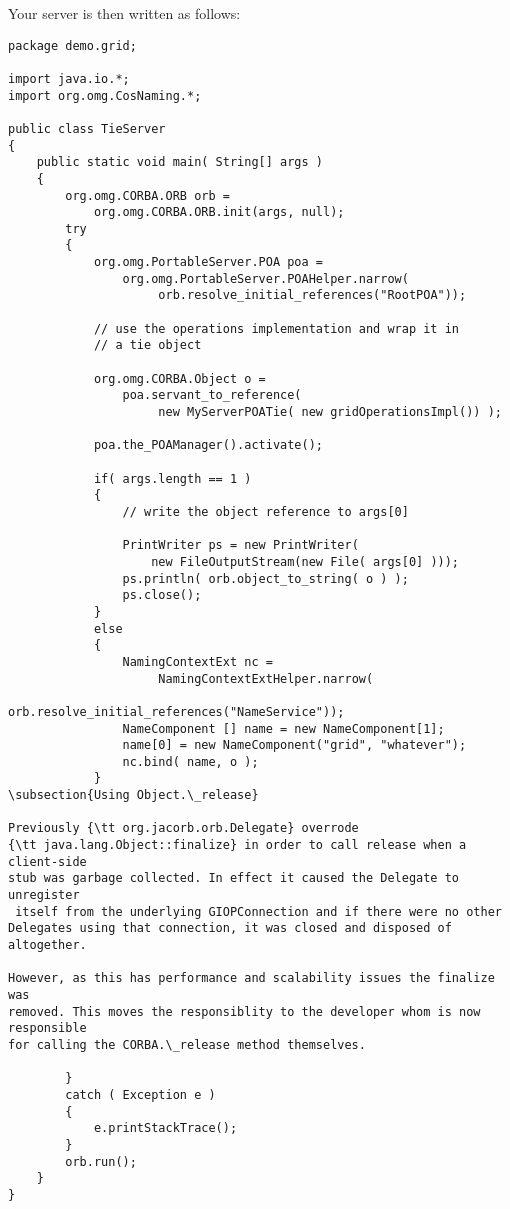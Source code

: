Your server is then written as follows:

\begin{verbatim}
package demo.grid;

import java.io.*;
import org.omg.CosNaming.*;

public class TieServer
{
    public static void main( String[] args )
    {
        org.omg.CORBA.ORB orb =
            org.omg.CORBA.ORB.init(args, null);
        try
        {
            org.omg.PortableServer.POA poa =
                org.omg.PortableServer.POAHelper.narrow(
                     orb.resolve_initial_references("RootPOA"));

            // use the operations implementation and wrap it in
            // a tie object

            org.omg.CORBA.Object o =
                poa.servant_to_reference(
                     new MyServerPOATie( new gridOperationsImpl()) );

            poa.the_POAManager().activate();

            if( args.length == 1 )
            {
                // write the object reference to args[0]

                PrintWriter ps = new PrintWriter(
                    new FileOutputStream(new File( args[0] )));
                ps.println( orb.object_to_string( o ) );
                ps.close();
            }
            else
            {
                NamingContextExt nc =
                     NamingContextExtHelper.narrow(
                        orb.resolve_initial_references("NameService"));
                NameComponent [] name = new NameComponent[1];
                name[0] = new NameComponent("grid", "whatever");
                nc.bind( name, o );
            }
\subsection{Using Object.\_release}

Previously {\tt org.jacorb.orb.Delegate} overrode
{\tt java.lang.Object::finalize} in order to call release when a client-side
stub was garbage collected. In effect it caused the Delegate to unregister
 itself from the underlying GIOPConnection and if there were no other
Delegates using that connection, it was closed and disposed of altogether.

However, as this has performance and scalability issues the finalize was
removed. This moves the responsiblity to the developer whom is now responsible
for calling the CORBA.\_release method themselves.

        }
        catch ( Exception e )
        {
            e.printStackTrace();
        }
        orb.run();
    }
}
\end{verbatim}

